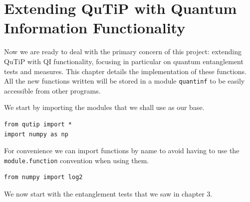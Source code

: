 \chapter{Extending QuTiP with Quantum Information Functionality}

Now we are ready to deal with the primary concern of this project: extending QuTiP with QI functionality, focusing in particular on quantum entanglement tests and measures. This chapter details the implementation of these functions. All the new functions written will be stored in a module \texttt{quantinf} to be easily accessible from other programs.
\par We start by importing the modules that we shall use as our base.
\begin{verbatim}
from qutip import *
import numpy as np
\end{verbatim}
For convenience we can import functions by name to avoid having to use the \texttt{module.function} convention when using them.
\begin{verbatim}
from numpy import log2
\end{verbatim}
\par We now start with the entanglement tests that we saw in chapter 3.
